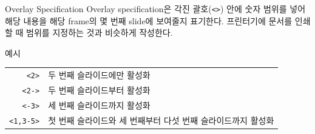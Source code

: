 \documentclass[compress]{beamer}
\begin{document}
\begin{frame}[fragile]{Overlay Specification}
  Overlay specification은 각진 괄호(\verb/<>/) 안에 숫자 범위를 넣어 해당
  내용을 해당 frame의 몇 번째 slide에 보여줄지 표기한다.
  프린터기에 문서를 인쇄할 때 범위를 지정하는 것과 비슷하게 작성한다.
  \vpad
  \begin{exampleblock}{예시}
    \footnotesize
    \begin{tabular}{rl}
      \verb/<2>/ & 두 번째 슬라이드에만 활성화\\
      \verb/<2->/ & 두 번째 슬라이드부터 활성화\\
      \verb/<-3>/ & 세 번째 슬라이드까지 활성화\\
      \verb/<1,3-5>/ & 첫 번째 슬라이드와 세 번째부터 다섯 번째 슬라이드까지
      활성화
    \end{tabular}
  \end{exampleblock}
\end{frame}
\end{document}
